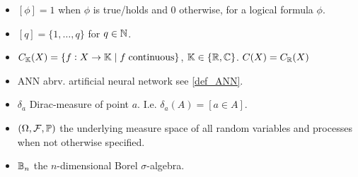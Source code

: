 



\begin{itemize}
  \item $[\phi] = 1$ when $\phi$ is true/holds and $0$ otherwise,
    for a logical formula $\phi$.
  \item $[q] = \{1,\dots,q\}$ for $q\in \mathbb{N}$.
  \item $C_{\mathbb{K}}(X) = \{ f : X \to \mathbb{K} \mid f \; \text{continuous} \}$,
    $\mathbb{K} \in \{ \mathbb{R}, \mathbb{C} \}$. $C(X) = C_\mathbb{R}(X)$
  \item ANN abrv. artificial neural network see \cref{def_ANN}.
  \item $\delta_a$ Dirac-measure of point $a$. I.e. $\delta_a(A) = [a \in A]$.
  \item $(\Omega, \mathcal{F}, \mathbb{P})$ the underlying measure space
    of all random variables and processes when not otherwise specified.
  \item $\mathbb{B}_n$ the $n$-dimensional Borel $\sigma$-algebra.
\end{itemize}
